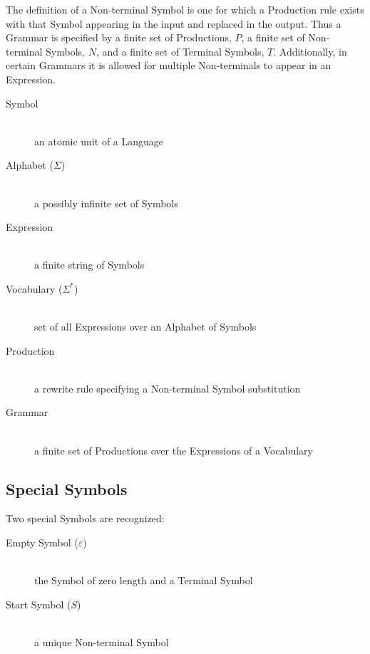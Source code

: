 \documentclass{article}
\begin{document}
The definition of a Non-terminal Symbol is one for which a Production
rule exists with that Symbol appearing in the input and replaced in
the output. Thus a Grammar is specified by a finite set of
Productions, $P$, a finite set of Non-terminal Symbols, $N$, and a
finite set of Terminal Symbols, $T$. Additionally, in certain Grammars
it is allowed for multiple Non-terminals to appear in an Expression.

\begin{description}

    \item[Symbol] \hfill \\
    an atomic unit of a Language

    \item[Alphabet ($\Sigma$)] \hfill \\
    a possibly infinite set of Symbols

    \item[Expression] \hfill \\
    a finite string of Symbols

    \item[Vocabulary ($\Sigma^{*}$)] \hfill \\
    set of all Expressions over an Alphabet of Symbols

    \item[Production] \hfill \\
    a rewrite rule specifying a Non-terminal Symbol substitution

    \item[Grammar] \hfill \\
    a finite set of Productions over the Expressions of a Vocabulary

\end{description}

\subsection{Special Symbols}

Two special Symbols are recognized:

    \begin{description}

    \item[Empty Symbol ($\varepsilon$)] \hfill \\
    the Symbol of zero length and a Terminal Symbol

    \item[Start Symbol ($S$)] \hfill \\
    a unique Non-terminal Symbol

    \end{description}
\end{document}
